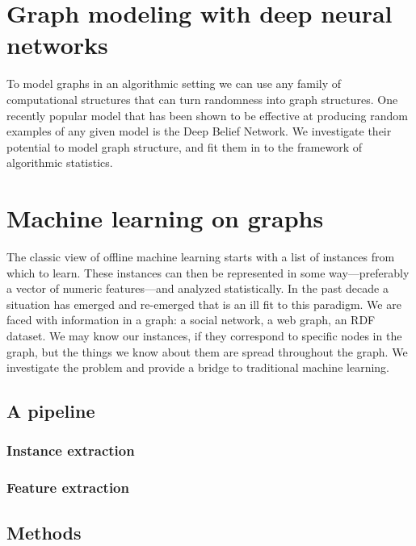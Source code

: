 \documentclass{thesis}
\begin{document}
\chapter{Graph modeling with deep neural networks}

\begin{summary}To model graphs in an algorithmic setting we can use any family of computational structures that can turn randomness into graph structures. One recently popular model that has been shown to be effective at producing random examples of any given model is the Deep Belief Network. We investigate their potential to model graph structure, and fit them in to the framework of algorithmic statistics.
\end{summary}

\chapter{Machine learning on graphs}


\begin{summary}The classic view of offline machine learning starts with a list of instances from which to learn. These instances can then be represented in some way---preferably a vector of numeric features---and analyzed statistically. In the past decade a situation has emerged and re-emerged that is an ill fit to this paradigm. We are faced with information in a graph: a social network, a web graph, an RDF dataset. We may know our instances, if they correspond to specific nodes in the graph, but the things we know about them are spread throughout the graph. We investigate the problem and provide a bridge to traditional machine learning.
\end{summary}

\section{A pipeline}
\subsection{Instance extraction}
\subsection{Feature extraction}
\section{Methods}
\end{document}

